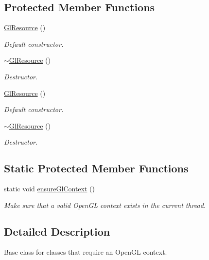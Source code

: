 \subsection*{Protected Member Functions}
\begin{DoxyCompactItemize}
\item 
\hyperlink{classsf_1_1_gl_resource_ad8fb7a0674f0f77e530dacc2a3b0dc6a}{Gl\-Resource} ()
\begin{DoxyCompactList}\small\item\em Default constructor. \end{DoxyCompactList}\item 
\hyperlink{classsf_1_1_gl_resource_ab99035b67052331d1e8cf67abd93de98}{$\sim$\-Gl\-Resource} ()
\begin{DoxyCompactList}\small\item\em Destructor. \end{DoxyCompactList}\item 
\hyperlink{classsf_1_1_gl_resource_ad8fb7a0674f0f77e530dacc2a3b0dc6a}{Gl\-Resource} ()
\begin{DoxyCompactList}\small\item\em Default constructor. \end{DoxyCompactList}\item 
\hyperlink{classsf_1_1_gl_resource_ab99035b67052331d1e8cf67abd93de98}{$\sim$\-Gl\-Resource} ()
\begin{DoxyCompactList}\small\item\em Destructor. \end{DoxyCompactList}\end{DoxyCompactItemize}
\subsection*{Static Protected Member Functions}
\begin{DoxyCompactItemize}
\item 
static void \hyperlink{classsf_1_1_gl_resource_ae0efa7935241644608ca32ba47b22a33}{ensure\-Gl\-Context} ()
\begin{DoxyCompactList}\small\item\em Make sure that a valid Open\-G\-L context exists in the current thread. \end{DoxyCompactList}\end{DoxyCompactItemize}


\subsection{Detailed Description}
Base class for classes that require an Open\-G\-L context. 

